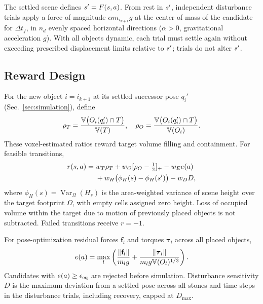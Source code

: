 The settled scene defines $s'=F(s,a)$.
From rest in $s'$, independent disturbance trials apply a force of magnitude $\alpha m_{i_{k+1}}g$ at the center of mass of the candidate for $\Delta t_f$, in $n_d$ evenly spaced horizontal directions ($\alpha>0$, gravitational acceleration $g$).
With all objects dynamic, each trial must settle again without exceeding prescribed displacement limits relative to $s'$; trials do not alter $s'$.



\subsection{Reward Design}\label{sec:reward}
For the new object $i=i_{k+1}$ at its settled successor pose $q_i'$ (Sec.~\ref{sec:simulation}), define
\begin{equation*}
 \rho_T=\frac{\mathbb{V}\bigl(O_i(q_i')\cap T\bigr)}{\mathbb{V}(T)},
 \quad
 \rho_O=\frac{\mathbb{V}\bigl(O_i(q_i')\cap T\bigr)}{\mathbb{V}(O_i)}.
\end{equation*}
These voxel-estimated ratios reward target volume filling and containment. For feasible transitions,
\begin{equation*}
\begin{split}
 r(s,a)={}&w_T\rho_T+w_O[\rho_O-\tfrac12]_+
 -w_E e(a)\\
 &+w_H\bigl(\phi_H(s)-\phi_H(s')\bigr)
 -w_D D,
\end{split}
\end{equation*}
where $\phi_H(s)=\operatorname{Var}_\Omega(H_s)$ is the area-weighted variance of scene height over the target footprint $\Omega$, with empty cells assigned zero height.
Loss of occupied volume within the target due to motion of previously placed objects is not subtracted. Failed transitions receive $r=-1$.

For pose-optimization residual forces $\mathbf f_l$ and torques $\boldsymbol\tau_l$ across all placed objects,
\begin{equation*}
 e(a)=\max_l\left(
 \frac{\|\mathbf f_l\|}{m_lg}
 +\frac{\|\boldsymbol\tau_l\|}{m_lg\mathbb{V}(O_l)^{1/3}}\right).
\end{equation*}
Candidates with $e(a)\geq\epsilon_\mathrm{eq}$ are rejected before simulation.
Disturbance sensitivity $D$ is the maximum deviation from a settled pose across all stones and time steps in the disturbance trials, including recovery, capped at $D_{\max}$.
